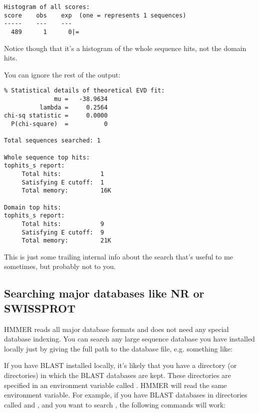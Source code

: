 {\small\begin{verbatim}
Histogram of all scores:
score    obs    exp  (one = represents 1 sequences)
-----    ---    ---
  489      1      0|=                                                          
\end{verbatim}}

Notice though that it's a histogram of the whole sequence hits, not
the domain hits.

You can ignore the rest of the  output:

{\small\begin{verbatim}
% Statistical details of theoretical EVD fit:
              mu =   -38.9634
          lambda =     0.2564
chi-sq statistic =     0.0000
  P(chi-square)  =          0

Total sequences searched: 1

Whole sequence top hits:
tophits_s report:
     Total hits:           1
     Satisfying E cutoff:  1
     Total memory:         16K

Domain top hits:
tophits_s report:
     Total hits:           9
     Satisfying E cutoff:  9
     Total memory:         21K
\end{verbatim}}

This is just some trailing internal info about the search that's
useful to me sometimes, but probably not to you.

\subsection{Searching major databases like NR or SWISSPROT}

HMMER reads all major database formats and does not need any special
database indexing. You can search any large sequence database you have
installed locally just by giving the full path to the database file,
e.g. something like:

\vspace{1.5em}

If you have BLAST installed locally, it's likely that you have a
directory (or directories) in which the BLAST databases are kept.
These directories are specified in an environment variable called . HMMER will read the same environment variable. For example,
if you have BLAST databases in directories
called 
and , and
you want to search ,
the following commands will work:

